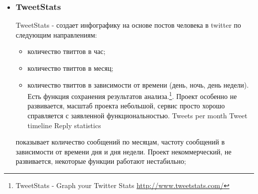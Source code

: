 \begin{itemize}
\begin{itemize}
\begin{itemize}
	\item система позволяет определить общий охват, а также «вес» каждого упоминания и его автора. Это особенно важно для формирования эффективной информационной политики, выбора подходящих площадок взаимодействия с аудиторией и выявления лидеров мнений.
Предусмотрена возможность реагирования;
	\item разнообразие отчетов, экспорт данных;
	\item автоматическая генерация отчетов по шаблону и рассылка по электронной почте согласно заданной схеме;
	\item возможность заказать аналитический отчет у экспертов в области мониторинга социальных медиа;
	\item ролевой доступ, система назначения заданий, журналирование действий операторов в системе.\footnote{Что такое Крибрум \url{http://www.kribrum.ru/about/}}
	\end{itemize}


\item \subsubsection{TweetStats}
TweetStats - создает инфографику на основе постов человека в twitter по следующим направлениям:
	\begin{itemize}
	\item количество твиттов в час;
	\item количество твиттов в месяц;
	\item количество твиттов в зависимости от времени (день, ночь, день недели).
Есть функция сохранения результатов анализа.\footnote{TweetStats - Graph your Twitter Stats \url{http://www.tweetstats.com/}}. Проект особенно не развивается, масштаб проекта небольшой, сервис просто хорошо справляется с заявленной функциональностью.
Tweets per month
Tweet timeline
Reply statistics
	\end{itemize}
показывает количество сообщений по месяцам, частоту сообщений в зависимости от времени дня и дня недели. Проект некоммерческий, не развивается, некоторые функции работают нестабильно;


\end{itemize}
\end{itemize}
